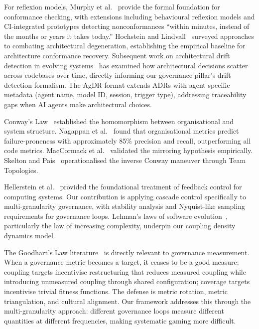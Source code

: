 \documentclass[11pt, a4paper]{googledeepmind}
\begin{document}
For reflexion models, Murphy et al.~\citep{murphy1995, murphy2001} provide the formal foundation for conformance checking, with extensions including behavioural reflexion models and CI-integrated prototypes detecting nonconformances ``within minutes, instead of the months or years it takes today.'' Hochstein and Lindvall~\citep{hochstein2005} surveyed approaches to combating architectural degeneration, establishing the empirical baseline for architecture conformance recovery. Subsequent work on architectural drift detection in evolving systems~\citep{passos2021} has examined how architectural decisions scatter across codebases over time, directly informing our governance pillar's drift detection formalism. The AgDR format extends ADRs with agent-specific metadata (agent name, model ID, session, trigger type), addressing traceability gaps when AI agents make architectural choices.

Conway's Law~\citep{conway1968} established the homomorphism between organisational and system structure. Nagappan et al.~\citep{nagappan2008} found that organisational metrics predict failure-proneness with approximately 85\% precision and recall, outperforming all code metrics. MacCormack et al.~\citep{maccormack2008} validated the mirroring hypothesis empirically. Skelton and Pais~\citep{skelton2019} operationalised the inverse Conway maneuver through Team Topologies.

Hellerstein et al.~\citep{hellerstein2004} provided the foundational treatment of feedback control for computing systems. Our contribution is applying cascade control specifically to multi-granularity governance, with stability analysis and Nyquist-like sampling requirements for governance loops. Lehman's laws of software evolution~\citep{Lehman1980}, particularly the law of increasing complexity, underpin our coupling density dynamics model.

The Goodhart's Law literature~\citep{goodhart1975, manheim2019goodhart} is directly relevant to governance measurement. When a governance metric becomes a target, it ceases to be a good measure: coupling targets incentivise restructuring that reduces measured coupling while introducing unmeasured coupling through shared configuration; coverage targets incentivise trivial fitness functions. The defense is metric rotation, metric triangulation, and cultural alignment. Our framework addresses this through the multi-granularity approach: different governance loops measure different quantities at different frequencies, making systematic gaming more difficult.
\end{document}

